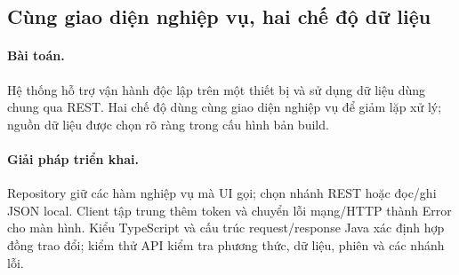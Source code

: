 \FloatBarrier
\subsection{Cùng giao diện nghiệp vụ, hai chế độ dữ liệu}
\label{sec:two-data-solution}
\paragraph{Bài toán.} Hệ thống hỗ trợ vận hành độc lập trên một thiết bị và sử dụng dữ liệu dùng chung qua REST. Hai chế độ dùng cùng giao diện nghiệp vụ để giảm lặp xử lý; nguồn dữ liệu được chọn rõ ràng trong cấu hình bản build.

\paragraph{Giải pháp triển khai.} Repository giữ các hàm nghiệp vụ mà UI gọi;  chọn nhánh REST hoặc đọc/ghi JSON local. Client tập trung thêm token và chuyển lỗi mạng/HTTP thành Error cho màn hình. Kiểu TypeScript và cấu trúc request/response Java xác định hợp đồng trao đổi; kiểm thử API kiểm tra phương thức, dữ liệu, phiên và các nhánh lỗi.
